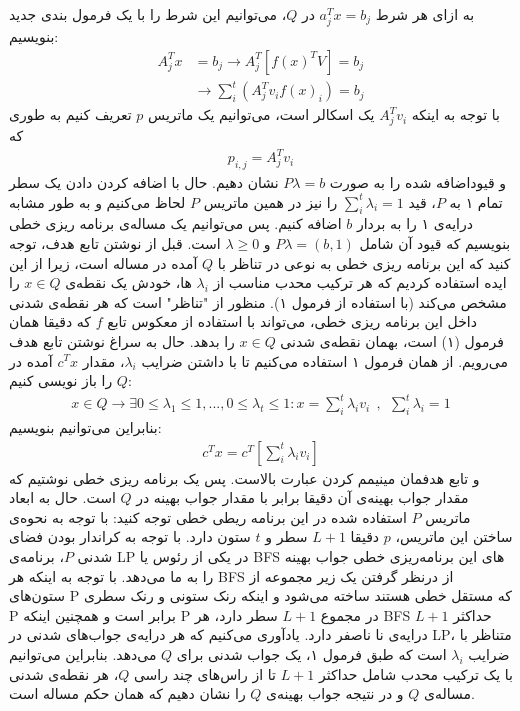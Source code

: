 \documentclass[a4paper,12pt]{article}
\begin{document}
به ازای هر شرط
$a_j^Tx = b_j$
در $Q$، می‌توانیم این شرط را با یک فرمول بندی جدید بنویسیم:
\begin{align*}
	A_j^Tx &= b_j \rightarrow A_j^T [f(x)^T V] = b_j \\ &\rightarrow \sum	_i^{t} (A_j^T v_i f(x)_i) = b_j 
\end{align*}
با توجه به اینکه
$A_j^T v_i$
یک اسکالر است، می‌توانیم یک ماتریس $p$ تعریف کنیم به طوری که
\begin{align*}
	p_{i,j} = A_j^T v_i
\end{align*}
و قیوداضافه شده را به صورت
$ P \lambda = b$
نشان دهیم.
حال با اضافه کردن دادن یک سطر  تمام ۱ به $P$، قید
$\sum_i^t \lambda_i = 1$
را نیز در همین ماتریس $P$ لحاظ می‌کنیم و به طور مشابه درایه‌ی ۱ را به بردار $b$ اضافه کنیم.
پس می‌توانیم یک مساله‌ی برنامه ریزی خطی بنویسیم که قیود آن شامل
$P\lambda = (b,1)$
و 
$\lambda \geq 0$
است.
قبل از نوشتن تابع هدف، توجه کنید که این برنامه ریزی خطی به نوعی در تناظر با $Q$ آمده در مساله است، زیرا از این ایده استفاده کردیم که هر ترکیب محدب مناسب از $\lambda_i$ ها، خودش یک نقطه‌ی $x \in Q$ را مشخص می‌کند (با استفاده از فرمول ۱). منظور از "تناظر" است که هر نقطه‌ی شدنی داخل این برنامه ریزی خطی، می‌تواند با استفاده از معکوس تابع $f$ که دقیقا همان فرمول (۱) است، بهمان نقطه‌ی شدنی $x \in Q$ را بدهد.
حال به سراغ نوشتن تابع هدف می‌رویم. از همان فرمول ۱ استفاده می‌کنیم تا با داشتن ضرایب $\lambda_i$، مقدار
$c^Tx$
آمده در $Q$ را باز نویسی کنیم:
\begin{align*}
	x \in Q \rightarrow \exists 0 \leq \lambda_1 \leq 1, ..., 0 \leq \lambda_t \leq 1 : x = \sum_i^t \lambda_i v_i \ \ , \ \ \sum_i^t \lambda_i = 1
\end{align*}
بنابراین می‌توانیم بنویسیم:
\begin{align*}
	c^Tx = c^T [\sum_i^t \lambda_i v_i]
\end{align*}
و تابع هدفمان مینیمم کردن عبارت بالاست.
پس یک برنامه ریزی خطی نوشتیم که مقدار جواب بهینه‌ی آن دقیقا برابر با  مقدار جواب بهینه‌ در $Q$ است.
\newline
حال به ابعاد ماتریس $P$ استفاده شده در این برنامه ریطی خطی توجه کنید: با توجه به نحوه‌ی ساختن این ماتریس، $p$ دقیقا $L+1$ سطر و $t$ ستون دارد. با توجه به کراندار بودن فضای شدنی $P$، برنامه‌ی LP در یکی از  رئوس یا BFS های این برنامه‌ریزی خطی جواب بهینه را به ما می‌دهد. با توجه به اینکه هر BFS از درنظر گرفتن یک زیر مجموعه از ستون‌های P که مستقل خطی هستند ساخته می‌شود و اینکه رنک ستونی و رنک سطری P برابر است و همچنین اینکه P در مجموع $L+1$ سطر دارد، هر BFS حداکثر $L+1$ درایه‌ی نا ناصفر دارد. یادآوری می‌کنیم که هر درایه‌ی جواب‌های شدنی در LP، متناظر با ضرایب $\lambda_i$ است که طبق فرمول ۱، یک جواب شدنی برای $Q$ می‌دهد. بنابراین می‌توانیم با یک ترکیب محدب شامل حداکثر $L+1$ تا از راس‌های چند راسی $Q$، هر نقطه‌ی شدنی مساله‌ی $Q$ و در نتیجه جواب بهینه‌ی $Q$ را نشان دهیم که همان حکم مساله است.
\end{document}
